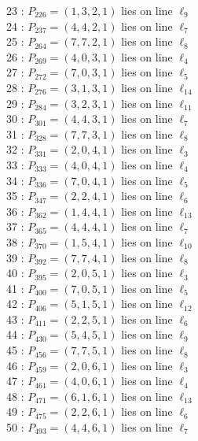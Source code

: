 \documentclass{article}
\begin{document}
{\begin{multicols}{2}
23 : $P_{226}=( 1, 3, 2, 1 )$ lies on line $\ell_{9}$\\
24 : $P_{237}=( 4, 4, 2, 1 )$ lies on line $\ell_{7}$\\
25 : $P_{264}=( 7, 7, 2, 1 )$ lies on line $\ell_{8}$\\
26 : $P_{269}=( 4, 0, 3, 1 )$ lies on line $\ell_{4}$\\
27 : $P_{272}=( 7, 0, 3, 1 )$ lies on line $\ell_{5}$\\
28 : $P_{276}=( 3, 1, 3, 1 )$ lies on line $\ell_{14}$\\
29 : $P_{284}=( 3, 2, 3, 1 )$ lies on line $\ell_{11}$\\
30 : $P_{301}=( 4, 4, 3, 1 )$ lies on line $\ell_{7}$\\
31 : $P_{328}=( 7, 7, 3, 1 )$ lies on line $\ell_{8}$\\
32 : $P_{331}=( 2, 0, 4, 1 )$ lies on line $\ell_{3}$\\
33 : $P_{333}=( 4, 0, 4, 1 )$ lies on line $\ell_{4}$\\
34 : $P_{336}=( 7, 0, 4, 1 )$ lies on line $\ell_{5}$\\
35 : $P_{347}=( 2, 2, 4, 1 )$ lies on line $\ell_{6}$\\
36 : $P_{362}=( 1, 4, 4, 1 )$ lies on line $\ell_{13}$\\
37 : $P_{365}=( 4, 4, 4, 1 )$ lies on line $\ell_{7}$\\
38 : $P_{370}=( 1, 5, 4, 1 )$ lies on line $\ell_{10}$\\
39 : $P_{392}=( 7, 7, 4, 1 )$ lies on line $\ell_{8}$\\
40 : $P_{395}=( 2, 0, 5, 1 )$ lies on line $\ell_{3}$\\
41 : $P_{400}=( 7, 0, 5, 1 )$ lies on line $\ell_{5}$\\
42 : $P_{406}=( 5, 1, 5, 1 )$ lies on line $\ell_{12}$\\
43 : $P_{411}=( 2, 2, 5, 1 )$ lies on line $\ell_{6}$\\
44 : $P_{430}=( 5, 4, 5, 1 )$ lies on line $\ell_{9}$\\
45 : $P_{456}=( 7, 7, 5, 1 )$ lies on line $\ell_{8}$\\
46 : $P_{459}=( 2, 0, 6, 1 )$ lies on line $\ell_{3}$\\
47 : $P_{461}=( 4, 0, 6, 1 )$ lies on line $\ell_{4}$\\
48 : $P_{471}=( 6, 1, 6, 1 )$ lies on line $\ell_{13}$\\
49 : $P_{475}=( 2, 2, 6, 1 )$ lies on line $\ell_{6}$\\
50 : $P_{493}=( 4, 4, 6, 1 )$ lies on line $\ell_{7}$\\

\end{multicols}}
\end{document}
